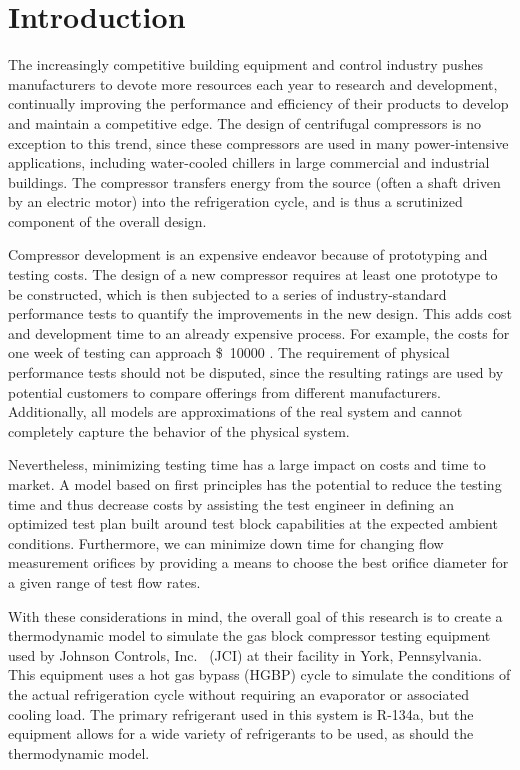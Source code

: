 \chapter{Introduction} \label{cha:intro}
The increasingly competitive building equipment and control industry 
pushes manufacturers to devote more resources each year to research and 
development, continually improving the performance and efficiency 
of their products to develop and maintain a competitive edge. 
The design of centrifugal compressors is no exception to this trend, 
since these compressors are used in many power-intensive applications,
including water-cooled chillers in large commercial and industrial buildings. 
The compressor transfers energy from the source (often a shaft driven by an 
electric motor) into the refrigeration cycle, and is thus 
a scrutinized component of the overall design.

Compressor development is an expensive endeavor 
because of prototyping and testing costs. 
The design of a new compressor requires at least one 
prototype to be constructed, which is then subjected to 
a series of industry-standard performance tests 
to quantify the improvements in the new design.
This adds cost and development time to an already expensive process. 
For example, the costs for one week of testing can approach 
\SI{10000}[\$]{} \citep{sommer2013}.
The requirement of physical performance tests should not be disputed, 
since the resulting ratings are used by potential customers 
to compare offerings from different manufacturers. 
Additionally, all models are approximations of the real system and 
cannot completely capture the behavior of the physical system.

Nevertheless, minimizing testing time has a 
large impact on costs and time to market. 
A model based on first principles has the potential to 
reduce the testing time and thus decrease costs by 
assisting the test engineer in defining an optimized test plan 
built around test block capabilities at the expected ambient conditions.
Furthermore, we can minimize down time for changing 
flow measurement orifices by providing a means 
to choose the best orifice diameter for a given range of test flow rates.

With these considerations in mind, the overall goal of this research is to 
create a thermodynamic model to simulate the  gas block 
compressor testing equipment used by Johnson Controls, Inc.~%
(JCI) 
at their facility in York, Pennsylvania. 
This equipment uses a hot gas bypass
(HGBP) cycle to simulate the conditions of the actual refrigeration cycle
without requiring an evaporator or associated cooling load.
The primary refrigerant used in this system is R-134a, but the equipment
allows for a wide variety of refrigerants to be used, as should the 
thermodynamic model.

